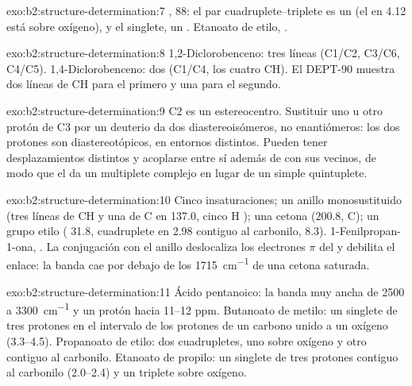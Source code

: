 \begin{solution}{exo:b2:structure-determination:7}
, 88: el par cuadruplete--triplete es un  (el  en 4.12 está sobre oxígeno), y el
singlete, un . Etanoato de etilo, .
\end{solution}

\begin{solution}{exo:b2:structure-determination:8}
1,2-Diclorobenceno: tres líneas (C1/C2, C3/C6, C4/C5). 1,4-Diclorobenceno: dos (C1/C4, los cuatro
CH). El DEPT-90 muestra dos líneas de CH para el primero y una para el segundo.
\end{solution}

\begin{solution}{exo:b2:structure-determination:9}
C2 es un estereocentro. Sustituir uno u otro protón de C3 por un deuterio da dos
diastereoisómeros, no enantiómeros: los dos protones son diastereotópicos, en entornos distintos.
Pueden tener desplazamientos distintos y acoplarse entre sí además de con sus vecinos, de modo que el
 da un multiplete complejo en lugar de un simple quintuplete.
\end{solution}

\begin{solution}{exo:b2:structure-determination:10}
Cinco insaturaciones; un anillo monosustituido (tres líneas de CH y una de C en 137.0, cinco H
); una cetona (200.8, C); un grupo etilo ( 31.8, cuadruplete en 2.98 contiguo al carbonilo, 
8.3). 1-Fenilpropan-1-ona, . La conjugación con el anillo deslocaliza los electrones $\pi$ del 
y debilita el enlace: la banda cae por debajo de los \qty{1715}{cm^{-1}} de una cetona saturada.
\end{solution}

\begin{solution}{exo:b2:structure-determination:11}
Ácido pentanoico: la banda  muy ancha de 2500 a \qty{3300}{cm^{-1}} y un protón hacia 11--12
ppm. Butanoato de metilo: un singlete de tres protones en el intervalo de los protones de un carbono unido a un oxígeno
(3.3--4.5). Propanoato de etilo: dos cuadrupletes, uno sobre oxígeno y otro contiguo al carbonilo. Etanoato de
propilo: un singlete de tres protones contiguo al carbonilo (2.0--2.4) y un triplete sobre oxígeno.
\end{solution}

